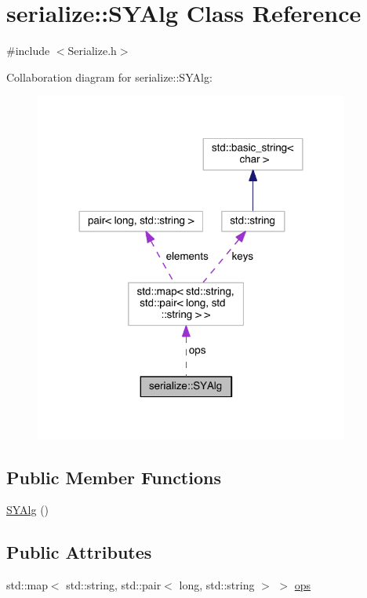 \hypertarget{classserialize_1_1_s_y_alg}{}\section{serialize\+:\+:S\+Y\+Alg Class Reference}
\label{classserialize_1_1_s_y_alg}


{\ttfamily \#include $<$Serialize.\+h$>$}



Collaboration diagram for serialize\+:\+:S\+Y\+Alg\+:\nopagebreak
\begin{figure}[H]
\begin{center}
\leavevmode
\includegraphics[width=293pt]{classserialize_1_1_s_y_alg__coll__graph}
\end{center}
\end{figure}
\subsection*{Public Member Functions}
\begin{DoxyCompactItemize}
\item 
\hyperlink{classserialize_1_1_s_y_alg_a0e57b976c122fc29293c26e3e4c3ae55}{S\+Y\+Alg} ()
\end{DoxyCompactItemize}
\subsection*{Public Attributes}
\begin{DoxyCompactItemize}
\item 
std\+::map$<$ std\+::string, std\+::pair$<$ long, std\+::string $>$ $>$ \hyperlink{classserialize_1_1_s_y_alg_a1e3689b2ee1e8e0f088407e854fca3ab}{ops}
\end{DoxyCompactItemize}


